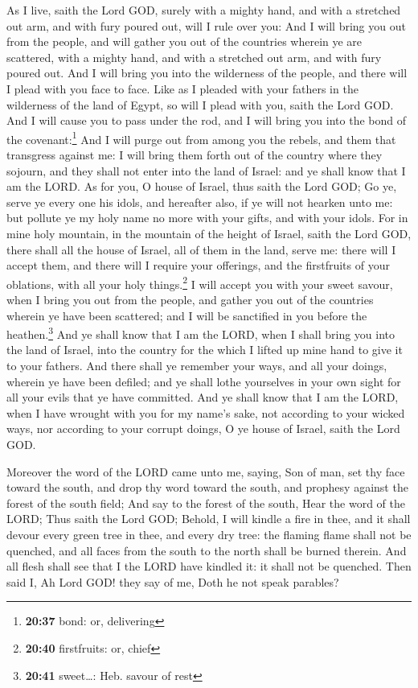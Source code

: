  As I live, saith the Lord GOD, surely with a mighty
hand, and with a stretched out arm, and with fury poured out, will I
rule over you:  And I will bring you out from the people,
and will gather you out of the countries wherein ye are scattered, with
a mighty hand, and with a stretched out arm, and with fury poured out.
 And I will bring you into the wilderness of the people,
and there will I plead with you face to face.  Like as I
pleaded with your fathers in the wilderness of the land of Egypt, so
will I plead with you, saith the Lord GOD.  And I will
cause you to pass under the rod, and I will bring you into the bond of
the covenant:\footnote{\textbf{20:37} bond: or, delivering}
 And I will purge out from among you the rebels, and them
that transgress against me: I will bring them forth out of the country
where they sojourn, and they shall not enter into the land of Israel:
and ye shall know that I am the LORD.  As for you, O
house of Israel, thus saith the Lord GOD; Go ye, serve ye every one his
idols, and hereafter also, if ye will not hearken unto me: but pollute
ye my holy name no more with your gifts, and with your idols.
 For in mine holy mountain, in the mountain of the height
of Israel, saith the Lord GOD, there shall all the house of Israel, all
of them in the land, serve me: there will I accept them, and there will
I require your offerings, and the firstfruits of your oblations, with
all your holy things.\footnote{\textbf{20:40} firstfruits: or, chief}
 I will accept you with your sweet savour, when I bring
you out from the people, and gather you out of the countries wherein ye
have been scattered; and I will be sanctified in you before the
heathen.\footnote{\textbf{20:41} sweet\ldots: Heb. savour of rest}
 And ye shall know that I am the LORD, when I shall bring
you into the land of Israel, into the country for the which I lifted up
mine hand to give it to your fathers.  And there shall ye
remember your ways, and all your doings, wherein ye have been defiled;
and ye shall lothe yourselves in your own sight for all your evils that
ye have committed.  And ye shall know that I am the LORD,
when I have wrought with you for my name's sake, not according to your
wicked ways, nor according to your corrupt doings, O ye house of Israel,
saith the Lord GOD.

 Moreover the word of the LORD came unto me, saying,
 Son of man, set thy face toward the south, and drop thy
word toward the south, and prophesy against the forest of the south
field;  And say to the forest of the south, Hear the word
of the LORD; Thus saith the Lord GOD; Behold, I will kindle a fire in
thee, and it shall devour every green tree in thee, and every dry tree:
the flaming flame shall not be quenched, and all faces from the south to
the north shall be burned therein.  And all flesh shall
see that I the LORD have kindled it: it shall not be quenched.
 Then said I, Ah Lord GOD! they say of me, Doth he not
speak parables?

